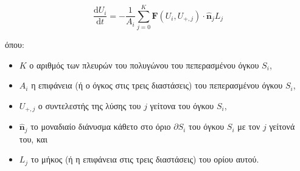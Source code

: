 \begin{equation}
    \frac{\mathrm{d} U_i}{\mathrm{d} t} = -\frac{1}{A_i}
    \sum_{j = 0}^{K} \mathbf{F} \left( U_i, U_{+,j} \right) \cdot \mathbf{\hat{n}}_{j} L_{j}
\end{equation}

όπου:

\begin{itemize}
    \item $K$ ο αριθμός των πλευρών του πολυγώνου του πεπερασμένου όγκου $S_i$,
    \item $A_i$ η επιφάνεια (ή ο όγκος στις τρεις διαστάσεις) του πεπερασμένου όγκου $S_i$,
    \item $U_{+,j}$ ο συντελεστής της λύσης του $j$ γείτονα του όγκου $S_i$,
    \item $\mathbf{\hat{n}}_{j}$ το μοναδιαίο διάνυσμα κάθετο στο όριο $\partial S_i$ του όγκου $S_i$ με τον $j$ γείτονά του, και
    \item $L_j$ το μήκος (ή η επιφάνεια στις τρεις διαστάσεις) του ορίου αυτού.
\end{itemize}

